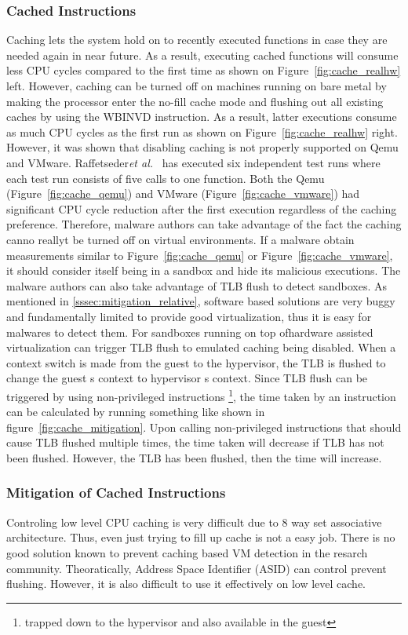 \subsubsection{Cached Instructions}
Caching lets the system hold on to recently executed functions in case they are needed again in near future. As a result, executing cached functions will consume less CPU cycles compared to the first time as shown on Figure~\ref{fig:cache_realhw} left. However, caching can be turned off on machines running on bare metal by making the processor enter the no-fill cache mode and flushing out all existing caches by using the WBINVD instruction. As a result, latter executions consume as much CPU cycles as the first run as shown on Figure~\ref{fig:cache_realhw} right.
However, it was shown that disabling caching is not properly supported on Qemu and VMware. Raffetseder{\em et al.}~\cite{raffetseder2007} has executed six independent test runs where each test run consists of five calls to one function. Both the Qemu (Figure~\ref{fig:cache_qemu}) and VMware (Figure~\ref{fig:cache_vmware}) had significant CPU cycle reduction after the first execution regardless of the caching preference.
Therefore, malware authors can take advantage of the fact the caching canno reallyt be turned off on virtual environments. If a malware obtain measurements similar to Figure~\ref{fig:cache_qemu} or Figure~\ref{fig:cache_vmware}, it should consider itself being in a sandbox and hide its malicious executions.
The malware authors can also take advantage of TLB flush to detect sandboxes. As mentioned in \ref{sssec:mitigation_relative}, software based solutions are very buggy and fundamentally limited to provide good virtualization, thus it is easy for malwares to detect them. For sandboxes running on top ofhardware assisted virtualization can trigger TLB flush to emulated caching being disabled. When a context switch is made from the guest to the hypervisor, the TLB is flushed to change the guest \textquotesingle s context to hypervisor \textquotesingle s context. Since TLB flush can be triggered by using non-privileged instructions \footnote{trapped down to the hypervisor and also available in the guest}, the time taken by an instruction can be calculated by running something like shown in figure~\ref{fig:cache_mitigation}. Upon calling non-privileged instructions that should cause TLB flushed multiple times, the time taken will decrease if TLB has not been flushed. However, the TLB has been flushed, then the time will increase. 

\subsubsection{Mitigation of Cached Instructions}
Controling low level CPU caching is very difficult due to 8 way set associative architecture. Thus, even just trying to fill up cache is not a easy job. There is no good solution known to prevent caching based VM detection in the resarch community. Theoratically, Address Space Identifier  (ASID) can control prevent flushing. However, it is also difficult to use it effectively on low level cache. 

